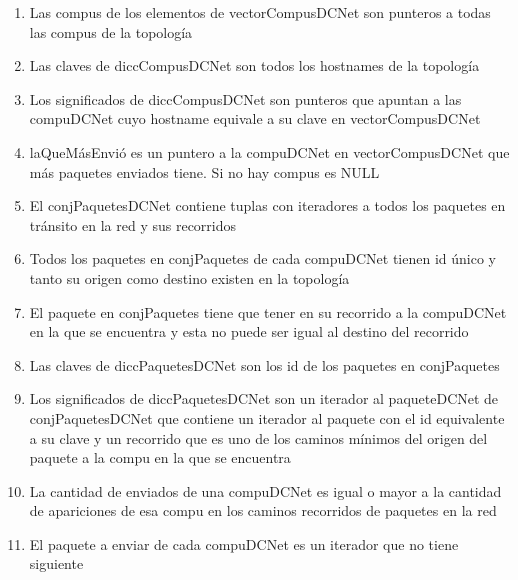 \begin{enumerate}
	\item Las compus de los elementos de vectorCompusDCNet son punteros a todas las compus de
		la topología
	\item Las claves de diccCompusDCNet son todos los hostnames de la topología
	\item Los significados de diccCompusDCNet son punteros que apuntan a las
		compuDCNet cuyo hostname equivale a su clave en vectorCompusDCNet
	\item laQueMásEnvió es un puntero a la compuDCNet en vectorCompusDCNet que
		más paquetes enviados tiene. Si no hay compus es NULL
	\item El conjPaquetesDCNet contiene tuplas con iteradores a todos los
		paquetes en tránsito en la red y sus recorridos
	\item Todos los paquetes en conjPaquetes de cada compuDCNet tienen id único
		y tanto su origen como destino existen en la topología
	\item El paquete en conjPaquetes tiene que tener en su recorrido a la
		compuDCNet en la que se encuentra y esta no puede ser igual al
		destino del recorrido
	\item Las claves de diccPaquetesDCNet son los id de los paquetes en
		conjPaquetes
	\item Los significados de diccPaquetesDCNet son un iterador al
		paqueteDCNet de conjPaquetesDCNet que contiene un iterador al
		paquete con el id equivalente a su clave y un recorrido que es uno de
		los caminos mínimos del origen del paquete a la compu en la que se
		encuentra
	\item La cantidad de enviados de una compuDCNet es igual o mayor a la
		cantidad de apariciones de esa compu en los caminos recorridos de
		paquetes en la red
	\item El paquete a enviar de cada compuDCNet es un iterador que no tiene siguiente
\end{enumerate}

\pagebreak

